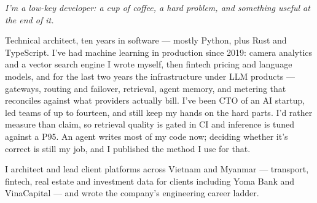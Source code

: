 \documentclass[10pt,a4paper,ragged2e,withhyper]{altacv}
\begin{document}
\fontsize{9.6pt}{11.6pt}\selectfont
{}
\ifdefined\nophoto\else{}\fi


\makecvheader

\begin{minipage}{\linewidth}
\justifying
\textit{\textcolor{accent}{I'm a low-key developer: a cup of coffee, a hard problem, and something useful at the end of it.}}

\smallskip
Technical architect, ten years in software --- mostly Python, plus Rust and TypeScript. I've had machine learning in production since 2019: camera analytics and a vector search engine I wrote myself, then fintech pricing and language models, and for the last two years the infrastructure under LLM products --- gateways, routing and failover, retrieval, agent memory, and metering that reconciles against what providers actually bill. I've been CTO of an AI startup, led teams of up to fourteen, and still keep my hands on the hard parts. I'd rather measure than claim, so retrieval quality is gated in CI and inference is tuned against a P95. An agent writes most of my code now; deciding whether it's correct is still my job, and I published the method I use for that.
\end{minipage}



\begin{minipage}{\linewidth}
\justifying
I architect and lead client platforms across Vietnam and Myanmar --- transport, fintech, real estate and investment data for clients including Yoma Bank and VinaCapital --- and wrote the company's engineering career ladder.
\end{minipage}
\end{document}
